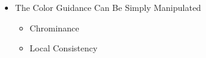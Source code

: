 \documentclass[CJK,aspectratio=169]{beamer}  %
\begin{document}
\begin{frame}
\begin{itemize}
\begin{itemize}
			\item The Color Guidance Can Be Simply Manipulated
			
			
				\begin{itemize}
					
					\item Chrominance
					
					
					
					\item Local Consistency
				\end{itemize}
			
			\end{itemize}

			
		\end{itemize}
			
	\end{frame}
	
\end{document}
